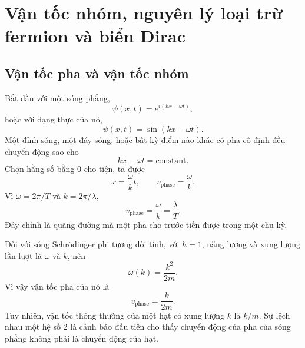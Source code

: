 \chapter{Vận tốc nhóm, nguyên lý loại trừ fermion và biển Dirac}

\section{Vận tốc pha và vận tốc nhóm}

\begin{classroomqa}
\end{classroomqa}

Bắt đầu với một sóng phẳng,
\begin{equation}
\psi(x,t)=e^{i(kx-\omega t)},
\end{equation}
hoặc với dạng thực của nó,
\begin{equation}
\psi(x,t)=\sin(kx-\omega t).
\end{equation}
Một đỉnh sóng, một đáy sóng, hoặc bất kỳ điểm nào khác có pha cố định đều chuyển động sao cho
\begin{equation}
kx-\omega t=\text{constant}.
\end{equation}
Chọn hằng số bằng 0 cho tiện, ta được
\begin{equation}
x=\frac{\omega}{k}t,
\qquad
v_{\mathrm{phase}}=\frac{\omega}{k}.
\end{equation}
Vì \(\omega=2\pi/T\) và \(k=2\pi/\lambda\),
\begin{equation}
v_{\mathrm{phase}}=\frac{\omega}{k}=\frac{\lambda}{T}.
\end{equation}
Đây chính là quãng đường mà một pha cho trước tiến được trong một chu kỳ.

Đối với sóng Schr\"odinger phi tương đối tính, với \(\hbar=1\), năng lượng và xung lượng lần lượt là \(\omega\) và \(k\), nên
\begin{equation}
\omega(k)=\frac{k^2}{2m}.
\end{equation}
Vì vậy vận tốc pha của nó là
\begin{equation}
v_{\mathrm{phase}}=\frac{k}{2m}.
\end{equation}
Tuy nhiên, vận tốc thông thường của một hạt có xung lượng \(k\) là \(k/m\). Sự lệch nhau một hệ số 2 là cảnh báo đầu tiên cho thấy chuyển động của pha của sóng phẳng không phải là chuyển động của hạt.

